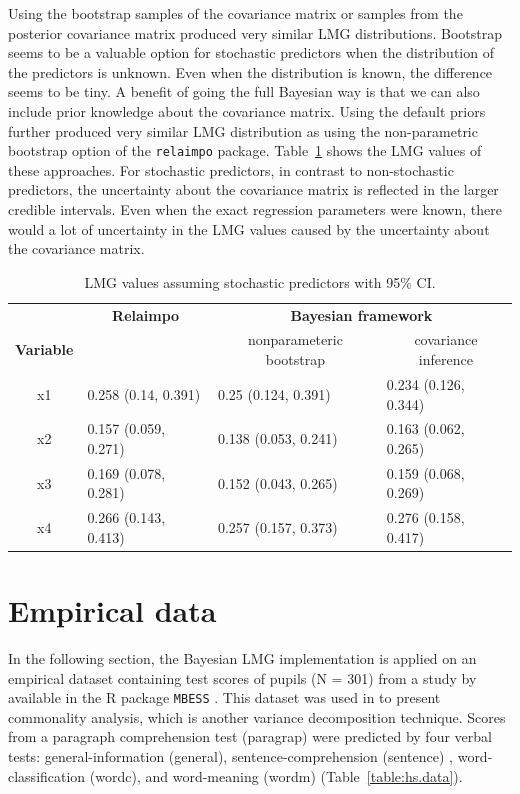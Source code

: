 \documentclass[11pt,a4paper,twoside]{book}\usepackage[]{graphicx}\usepackage[]{color}
\begin{document}
Using the bootstrap samples of the covariance matrix or samples from the posterior covariance matrix produced  very similar LMG distributions. Bootstrap seems to be a valuable option for stochastic predictors when the distribution of the predictors is unknown. Even when the distribution is known, the difference seems to be tiny. A benefit of going the full Bayesian way is that we can also include prior knowledge about the covariance matrix. Using the default priors further produced very similar LMG distribution as using the non-parametric bootstrap option of the \texttt{relaimpo} package. Table~\ref{tbl:nonstochEx1relaimpstoch} shows the LMG values of these approaches. For stochastic predictors, in contrast to non-stochastic predictors, the uncertainty about the covariance matrix is reflected in the larger credible intervals. Even when the exact regression parameters were known, there would a lot of uncertainty in the LMG values caused by the uncertainty about the covariance matrix. 








\begin{table}[h]
\caption{LMG values assuming stochastic predictors with 95\% CI.}
\centering
\begin{tabular}{clll}
   \toprule
  & \multicolumn{1}{c}{\textbf{Relaimpo}} & \multicolumn{2}{c}{\textbf{Bayesian framework}} \\ \cmidrule(r){2-2}\cmidrule(l){3-4}
 \textbf{Variable} &  & \multicolumn{1}{c}{nonparameteric bootstrap}& \multicolumn{1}{c}{covariance inference} \\
 \midrule
x1 & 0.258 (0.14, 0.391)  & 0.25 (0.124, 0.391) &  0.234 (0.126, 0.344) \\ 
x2 & 0.157 (0.059, 0.271)  & 0.138 (0.053, 0.241)  & 0.163 (0.062, 0.265) \\ 
x3 & 0.169 (0.078, 0.281)  & 0.152 (0.043, 0.265)  & 0.159 (0.068, 0.269) \\ 
x4 & 0.266 (0.143, 0.413) & 0.257 (0.157, 0.373) & 0.276 (0.158, 0.417) \\ 
   \bottomrule
\end{tabular}
\label{tbl:nonstochEx1relaimpstoch}
\end{table}







\clearpage

\section{Empirical data}
In the following section, the Bayesian LMG implementation is applied on an empirical dataset containing test scores of pupils (N = 301) from a study by \cite{Holzinger1939} available in the R package \texttt{MBESS} \citep{MBESS}. This dataset was used in \cite{Nimon2008} to present commonality analysis, which is another variance decomposition technique. Scores from a paragraph comprehension test (paragrap) were predicted by four verbal tests:  general-information (general),  sentence-comprehension (sentence) ,  word-classification (wordc), and  word-meaning (wordm) (Table~\ref{table:hs.data}). 
\end{document}
